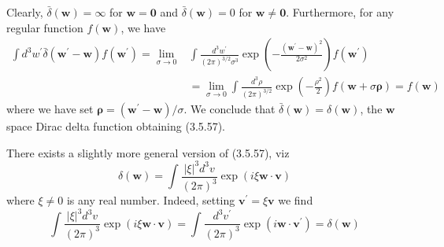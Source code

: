 \documentclass{article}
\begin{document}
Clearly, $\bar{\delta}(\boldsymbol{w})=\infty$ for $\boldsymbol{w}=\mathbf{0}$ and $\bar{\delta}(\boldsymbol{w})=0$ for $\boldsymbol{w} \neq \mathbf{0}$. Furthermore, for any regular function $f(\boldsymbol{w})$, we have
$$
\begin{align*}
\int d^{3} w^{\prime} \bar{\delta}\left(\boldsymbol{w}^{\prime}-\boldsymbol{w}\right) f\left(\boldsymbol{w}^{\prime}\right)=\lim _{\sigma \rightarrow 0} & \int \frac{d^{3} w^{\prime}}{(2 \pi)^{3 / 2} \sigma^{3}} \exp \left(-\frac{\left(\boldsymbol{w}^{\prime}-\boldsymbol{w}\right)^{2}}{2 \sigma^{2}}\right) f\left(\boldsymbol{w}^{\prime}\right)  \tag{3.5.63}\\
& =\lim _{\sigma \rightarrow 0} \int \frac{d^{3} \rho}{(2 \pi)^{3 / 2}} \exp \left(-\frac{\rho^{2}}{2}\right) f(\boldsymbol{w}+\sigma \boldsymbol{\rho})=f(\boldsymbol{w})
\end{align*}
$$
where we have set $\boldsymbol{\rho}=\left(\boldsymbol{w}^{\prime}-\boldsymbol{w}\right) / \sigma$. We conclude that $\bar{\delta}(\boldsymbol{w})=\delta(\boldsymbol{w})$, the $\boldsymbol{w}$ space Dirac delta function obtaining (3.5.57).

There exists a slightly more general version of (3.5.57), viz
$$
\begin{equation*}
\delta(\boldsymbol{w})=\int \frac{|\xi|^{3} d^{3} v}{(2 \pi)^{3}} \exp (i \xi \boldsymbol{w} \cdot \boldsymbol{v}) \tag{3.5.64}
\end{equation*}
$$
where $\xi \neq 0$ is any real number. Indeed, setting $\boldsymbol{v}^{\prime}=\xi \boldsymbol{v}$ we find
$$
\begin{equation*}
\int \frac{|\xi|^{3} d^{3} v}{(2 \pi)^{3}} \exp (i \xi \boldsymbol{w} \cdot \boldsymbol{v})=\int \frac{d^{3} v^{\prime}}{(2 \pi)^{3}} \exp \left(i \boldsymbol{w} \cdot \boldsymbol{v}^{\prime}\right)=\delta(\boldsymbol{w}) \tag{3.5.65}
\end{equation*}
$$
\end{document}
